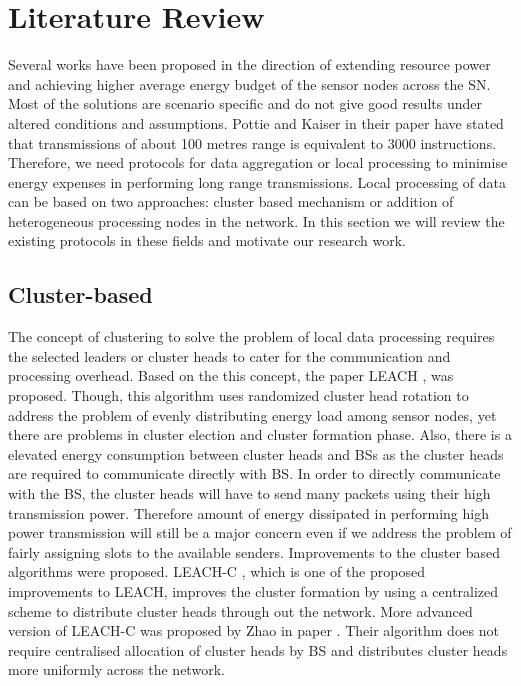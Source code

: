 
\chapter{Literature Review}\label{ch:literature}

Several works have been proposed in the direction of extending resource power and achieving higher average energy budget of the sensor nodes across the \ac{SN}. Most of the solutions are scenario specific and do not give good results under altered conditions and assumptions. Pottie and Kaiser \cite{pottie2000wireless} in their paper have stated that transmissions of about 100 metres range is equivalent to 3000 instructions. Therefore, we need protocols for data aggregation or local processing to minimise energy expenses in performing long range transmissions. Local processing of data can be based on two approaches: cluster based mechanism or addition of heterogeneous processing nodes in the network. In this section we will review the existing protocols in these fields and motivate our research work.

\section{Cluster-based}

The concept of clustering to solve the problem of local data processing requires the selected leaders or cluster heads to cater for the communication and processing overhead. Based on the this concept, the paper LEACH \cite{Heinzelman:2000}, was proposed. Though, this algorithm uses randomized cluster head rotation to address the problem of evenly distributing energy load among sensor nodes, yet there are problems in cluster election and cluster formation phase. Also, there is a elevated energy consumption between cluster heads and \acp{BS} as the cluster heads are required to communicate directly with \ac{BS}. In order to directly communicate with the \ac{BS}, the cluster heads will have to send many packets using their high transmission power. Therefore amount of energy dissipated in performing high power transmission will still be a major concern even if we address the problem of fairly assigning slots to the available senders. Improvements to the cluster based algorithms were proposed. LEACH-C \cite{Heinzelman:2002}, which is one of the proposed improvements to LEACH, improves the cluster formation by using a centralized scheme to distribute cluster heads through out the network. More advanced version of LEACH-C was proposed by Zhao in paper \cite{zhao2004energy}. Their algorithm does not require centralised allocation of cluster heads by \ac{BS} and distributes cluster heads more uniformly across the network. 

